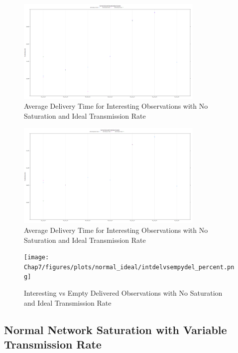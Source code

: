 	\begin{figure}[h]
	\centering
	\includegraphics[width=0.8\textwidth]{Chap7/figures/plots/normal_ideal/tpvsfp_delivered.png}
	\caption{Average Delivery Time for Interesting Observations with No Saturation and Ideal Transmission Rate}
	\label{fig:sim:res:norm:ideal:tpfp}
	\end{figure}

	\begin{figure}[h]
	\centering
	\includegraphics[width=0.8\textwidth]{Chap7/figures/plots/normal_ideal/tnvsfn_delivered.png}
	\caption{Average Delivery Time for Interesting Observations with No Saturation and Ideal Transmission Rate}
	\label{fig:sim:res:norm:ideal:tnfn}
	\end{figure}

	\begin{figure}[h]
	\centering
	\texttt{[image: Chap7/figures/plots/normal\_ideal/intdelvsempydel\_percent.png]}
	\caption{Interesting vs Empty Delivered Observations with No Saturation and Ideal Transmission Rate}
	\label{fig:sim:res:norm:ideal:intempt}
	\end{figure}



\subsection{Normal Network Saturation with Variable Transmission Rate}

